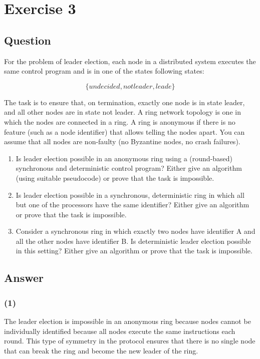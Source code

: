 \documentclass{article}
\begin{document}
\section*{Exercise 3}
\subsection*{Question}
For the problem of leader election, each node in a distributed system executes the same control program and is in one of the states following states:


\[
\{undecided, not leader, leade\}
\]


The task is to ensure that, on termination, exactly one node is in state leader, and all other nodes are in state not leader. A ring network topology is one in which the nodes are connected in a ring. A ring is anonymous if there is no feature (such as a node identifier) that allows telling the nodes apart. You can assume that all nodes are non-faulty (no Byzantine nodes, no crash failures).

\begin{enumerate}
    \item Is leader election possible in an anonymous ring using a (round-based) synchronous and deterministic control program? Either give an algorithm (using suitable pseudocode) or prove that the task is impossible.
    \item Is leader election possible in a synchronous, deterministic ring in which all but one of the processors have the same identifier? Either give an algorithm or prove that the task is impossible.
    \item Consider a synchronous ring in which exactly two nodes have identifier A and all the other nodes have identifier B. Is deterministic leader election possible in this setting? Either give an algorithm or prove that the task is impossible.
\end{enumerate}

\subsection*{Answer}
\subsubsection*{(1)}
The leader election is impossible in an anonymous ring because nodes cannot be individually identified because all nodes execute the same instructions each round. This type of symmetry in the protocol ensures that there is no single node that can break the ring and become the new leader of the ring.
\end{document}
